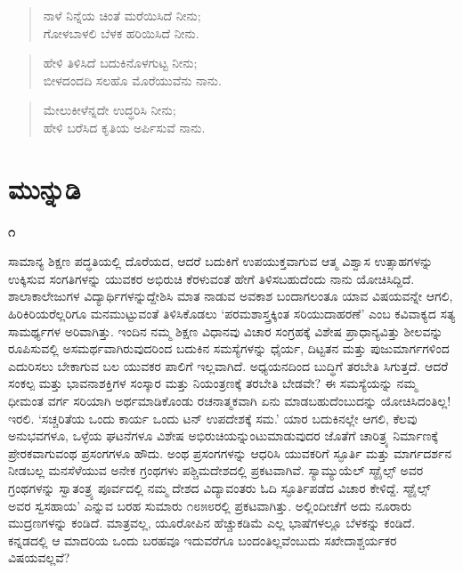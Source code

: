 \begin{verse}
ನಾಳೆ ನಿನ್ನೆಯ ಚಿಂತೆ ಮರೆಯಿಸಿದೆ ನೀನು;\\ಗೋಳಬಾಳಲಿ ಬೆಳಕ ಹರಿಯಿಸಿದೆ ನೀನು.
\end{verse}

\begin{verse}
ಹೇಳಿ ತಿಳಿಸಿದೆ ಬದುಕಿನೊಳಗುಟ್ಟ ನೀನು;\\ಬೀಳದಂದದಿ ಸಲಹೊ ಮೊರೆಯುವೆನು ನಾನು.
\end{verse}

\begin{verse}
ಮೇಲುಕೀಳೆನ್ನದೇ ಉದ್ಧರಿಸಿ ನೀನು;\\ಹೇಳಿ ಬರೆಸಿದ ಕೃತಿಯ ಅರ್ಪಿಸುವೆ ನಾನು.
\end{verse}


\chapter{ಮುನ್ನುಡಿ}

\centerline{{\Large\bfseries ೧}}

ಸಾಮಾನ್ಯ ಶಿಕ್ಷಣ ಪದ್ಧತಿಯಲ್ಲಿ ದೊರೆಯದ, ಆದರೆ ಬದುಕಿಗೆ ಉಪಯುಕ್ತವಾಗುವ ಆತ್ಮ ವಿಶ್ವಾಸ ಉತ್ಸಾಹಗಳನ್ನು ಉಕ್ಕಿಸುವ ಸಂಗತಿಗಳನ್ನು ಯುವಕರ ಅಭಿರುಚಿ ಕೆರಳುವಂತೆ ಹೇಗೆ ತಿಳಿಸಬಹುದೆಂದು ನಾನು ಯೋಚಿಸಿದ್ದಿದೆ. ಶಾಲಾಕಾಲೇಜುಗಳ ವಿದ್ಯಾರ್ಥಿಗಳನ್ನುದ್ದೇಶಿಸಿ ಮಾತ ನಾಡುವ ಅವಕಾಶ ಬಂದಾಗಲಂತೂ ಯಾವ ವಿಷಯವನ್ನೇ ಆಗಲಿ, ಹಿರಿಕಿರಿಯರೆಲ್ಲರಿಗೂ ಮನಮುಟ್ಟುವಂತೆ ತಿಳಿಸಿಕೊಡಲು ‘ಪರಮಶಾಸ್ತ್ರಕ್ಕಿಂತ ಸರಿಯುದಾಹರಣೆ’ ಎಂಬ ಕವಿವಾಕ್ಯದ ಸತ್ಯ ಸಾಮರ್ಥ್ಯಗಳ ಅರಿವಾಗಿತ್ತು. ಇಂದಿನ ನಮ್ಮ ಶಿಕ್ಷಣ ವಿಧಾನವು ವಿಚಾರ ಸಂಗ್ರಹಕ್ಕೆ ವಿಶೇಷ ಪ್ರಾಧಾನ್ಯವಿತ್ತು ಶೀಲವನ್ನು ರೂಪಿಸುವಲ್ಲಿ ಅಸಮರ್ಥವಾಗಿರುವುದರಿಂದ ಬದುಕಿನ ಸಮಸ್ಯೆಗಳನ್ನು ಧೈರ್ಯ, ದಿಟ್ಟತನ ಮತ್ತು ಪುಜುಮಾರ್ಗಗಳಿಂದ ಎದುರಿಸಲು ಬೇಕಾಗುವ ಬಲ ಯುವಕರ ಪಾಲಿಗೆ ಇಲ್ಲವಾಗಿದೆ. ಅಧ್ಯಯನದಿಂದ ಬುದ್ಧಿಗೆ ತರಬೇತಿ ಸಿಗುತ್ತದೆ. ಆದರೆ ಸಂಕಲ್ಪ ಮತ್ತು ಭಾವನಾಶಕ್ತಿಗಳ ಸಂಸ್ಕಾರ ಮತ್ತು ನಿಯಂತ್ರಣಕ್ಕೆ ತರಬೇತಿ ಬೇಡವೇ? ಈ ಸಮಸ್ಯೆಯನ್ನು ನಮ್ಮ ಧೀಮಂತ ವರ್ಗ ಸರಿಯಾಗಿ ಅರ್ಥಮಾಡಿಕೊಂಡು ರಚನಾತ್ಮಕವಾಗಿ ಏನು ಮಾಡಬಹುದೆಂಬುದನ್ನು ಯೋಚಿಸಿದಂತಿಲ್ಲ! ಇರಲಿ. ‘ಸಚ್ಚರಿತೆಯ ಒಂದು ಕಾರ್ಯ ಒಂದು ಟನ್ ಉಪದೇಶಕ್ಕೆ ಸಮ.’ ಯಾರ ಬದುಕಿನಲ್ಲೇ ಆಗಲಿ, ಕೆಲವು ಅನುಭವಗಳೂ, ಒಳ್ಳೆಯ ಘಟನೆಗಳೂ ವಿಶೇಷ ಅಭಿರುಚಿಯನ್ನುಂಟುಮಾಡುವುದರ ಜೊತೆಗೆ ಚಾರಿತ್ರ್ಯ ನಿರ್ಮಾಣಕ್ಕೆ ಪ್ರೇರಕವಾಗುವಂಥ ಪ್ರಸಂಗಗಳೂ ಹೌದು. ಅಂಥ ಪ್ರಸಂಗಗಳನ್ನು ಆಧರಿಸಿ ಯುವಕರಿಗೆ ಸ್ಫೂರ್ತಿ ಮತ್ತು ಮಾರ್ಗದರ್ಶನ ನೀಡಬಲ್ಲ ಮನಸೆಳೆಯುವ ಅನೇಕ ಗ್ರಂಥಗಳು ಪಶ್ಚಿಮದೇಶದಲ್ಲಿ ಪ್ರಕಟವಾಗಿವೆ. ಸ್ಯಾಮ್ಯುಯೆಲ್ ಸ್ಮಾೈಲ್ಸ್ ಅವರ ಗ್ರಂಥಗಳನ್ನು ಸ್ವಾತಂತ್ರ್ಯ ಪೂರ್ವದಲ್ಲಿ ನಮ್ಮ ದೇಶದ ವಿದ್ಯಾವಂತರು ಓದಿ ಸ್ಫೂರ್ತಿಪಡೆದ ವಿಚಾರ ಕೇಳಿದ್ದೆ. ಸ್ಮಾೈಲ್ಸ್ ಅವರ ಸ್ವಸಹಾಯ’ ಎನ್ನುವ ಬರಹ ಸುಮಾರು ೧೮೫೮ರಲ್ಲಿ ಪ್ರಕಟವಾಗಿತ್ತು. ಅಲ್ಲಿಂದೀಚೆಗೆ ಅದು ನೂರಾರು ಮುದ್ರಣಗಳನ್ನು ಕಂಡಿದೆ. ಮಾತ್ರವಲ್ಲ, ಯೂರೋಪಿನ ಹೆಚ್ಚುಕಡಿಮೆ ಎಲ್ಲ ಭಾಷೆಗಳಲ್ಲೂ ಬೆಳಕನ್ನು ಕಂಡಿದೆ. ಕನ್ನಡದಲ್ಲಿ ಆ ಮಾದರಿಯ ಒಂದು ಬರಹವೂ ಇದುವರೆಗೂ ಬಂದಂತಿಲ್ಲವೆಂಬುದು ಸಖೇದಾಶ್ಚರ್ಯಕರ ವಿಷಯವಲ್ಲವೆ?

